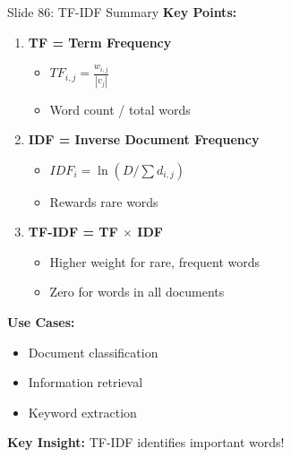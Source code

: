 \documentclass[8pt]{beamer}
\begin{document}
	\begin{frame}{Slide 86: TF-IDF Summary}
		\fontsize{6.5}{7.5}\selectfont
		\textbf{Key Points:}
		\begin{enumerate}
			\item \textbf{TF = Term Frequency}
			\begin{itemize}
				\item $TF_{i,j} = \frac{w_{i,j}}{|v_j|}$
				\item Word count / total words
			\end{itemize}
			\item \textbf{IDF = Inverse Document Frequency}
			\begin{itemize}
				\item $IDF_i = \ln(D / \sum d_{i,j})$
				\item Rewards rare words
			\end{itemize}
			\item \textbf{TF-IDF = TF $\times$ IDF}
			\begin{itemize}
				\item Higher weight for rare, frequent words
				\item Zero for words in all documents
			\end{itemize}
		\end{enumerate}
		
		\vspace{0.1cm}
		\textbf{Use Cases:}
		\begin{itemize}
			\item Document classification
			\item Information retrieval
			\item Keyword extraction
		\end{itemize}
		
		\textcolor{myblue}{\textbf{Key Insight:}} TF-IDF identifies important words!
	\end{frame}
	
\end{document}
